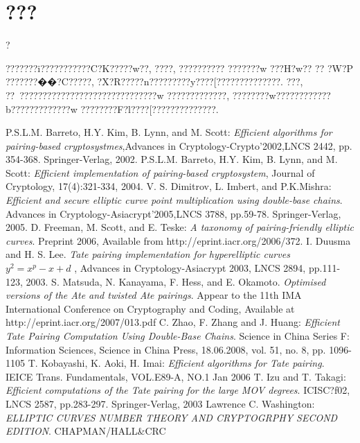 \documentclass[a4j,oneside,openany]{jsbook} %
\begin{document}
\chapter*{???}
?{???????i???????????C?K?????w??, ????, ??????????
???????w ???H?w?? ?? ?W?P ???????��?C?????, ?X?R?????n?????????y????[??????????????.
???, ??~??????????????????????????????w ?????????????, ????????w????????????b?????????????w ????????F?l????[??????????????.
\begin{thebibliography}{99}
	 P.S.L.M. Barreto, H.Y. Kim, B. Lynn, and M. Scott: {\em Efficient algorithms for pairing-based cryptosystmes},Advances in Cryptology-Crypto'2002,LNCS 2442, pp. 354-368. Springer-Verlag, 2002.
	 P.S.L.M. Barreto, H.Y. Kim, B. Lynn, and M. Scott: {\em Efficient implementation of pairing-based cryptosystem}, Journal of Cryptology, 17(4):321-334, 2004.
	 V. S. Dimitrov, L. Imbert, and P.K.Mishra: {\em Efficient and secure elliptic curve point multiplication using double-base chains}. Advances in Cryptology-Asiacrypt'2005,LNCS 3788, pp.59-78. Springer-Verlag, 2005.
	 D. Freeman, M. Scott, and E. Teske: {\em A taxonomy of pairing-friendly elliptic curves}. Preprint 2006, Available from http://eprint.iacr.org/2006/372.
	 I. Duusma and H. S. Lee. {\em Tate pairing implementation for hyperelliptic curves $y^2 = x^p -x + d$ }, Advances in Cryptology-Asiacrypt 2003, LNCS 2894, pp.111-123, 2003.
	 S. Matsuda, N. Kanayama, F. Hess, and E. Okamoto. {\em Optimised versions of the Ate and twisted Ate pairings}. Appear to the 11th IMA International Conference on Cryptography and Coding, Available at http://eprint.iacr.org/2007/013.pdf
	 C. Zhao, F. Zhang and J. Huang: {\em Efficient Tate Pairing Computation Using Double-Base Chains}. Science in China Series F: Information Sciences, Science in China Press, 18.06.2008, vol. 51, no. 8, pp. 1096-1105
	 T. Kobayashi, K. Aoki, H. Imai: {\em Efficient algorithms for Tate pairing}. IEICE Trans. Fundamentals, VOL.E89-A, NO.1 Jan 2006
	 T. Izu and T. Takagi: {\em Efficient computations of the Tate pairing for the large MOV degrees}. ICISC?f02, LNCS 2587, pp.283-297. Springer-Verlag, 2003
	 Lawrence C. Washington: {\em ELLIPTIC CURVES NUMBER THEORY AND CRYPTOGRPHY SECOND EDITION}. CHAPMAN/HALL\&CRC

\end{thebibliography}}
\end{document}
